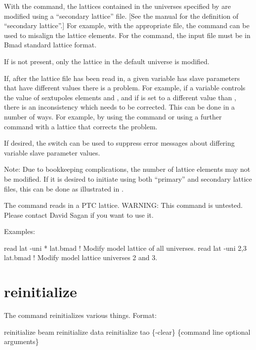\vskip 10pt 

With the  command, the  lattices contained in the universes specified by
 are modified using a ``secondary lattice'' file.  [See the \bmad manual for the
definition of ``secondary lattice''.] For example, with the appropriate file, the  command
can be used to misalign the lattice elements. For the  command, the input file must
be in Bmad standard lattice format.

If  is not present, only the  lattice
in the default universe is modified.

If, after the lattice file has been read in, a given \tao variable has slave parameters that have
different values there is a problem. For example, if a \tao variable controls the  value of
sextupoles elements  and , and if  is set to a different value than ,
there is an inconsistency which needs to be corrected. This can be done in a number of ways. For
example, by using the  command or using a further  command with
a lattice that corrects the problem.

If desired, the  switch can be used to suppress error messages about differing \tao
variable slave parameter values.

Note: Due to bookkeeping complications, the number of lattice elements may not be modified. If it is
desired to initiate \tao using both ``primary'' and secondary lattice files, this can be done as
illustrated in .

The  command reads in a PTC lattice. WARNING: This command is untested. Please contact
David Sagan if you want to use it.

Examples:
\begin{example}
  read lat -uni * lat.bmad   ! Modify model lattice of all universes.
  read lat -uni 2,3 lat.bmad ! Modify model lattice universes 2 and 3.
\end{example}

\section{reinitialize}
\label{s:reinit}

The  command reinitializes various things. Format:
\begin{example}
  reinitialize beam
  reinitialize data
  reinitialize tao \{-clear\} \{command line optional arguments\}
\end{example}

